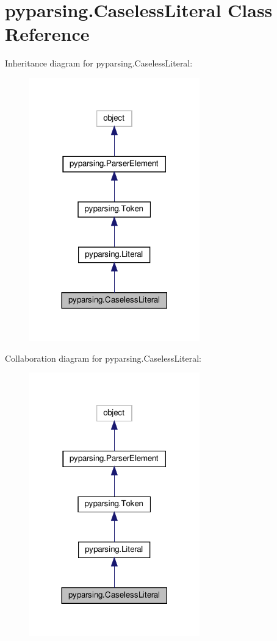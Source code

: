 \hypertarget{classpyparsing_1_1CaselessLiteral}{}\section{pyparsing.\+Caseless\+Literal Class Reference}
\label{classpyparsing_1_1CaselessLiteral}


Inheritance diagram for pyparsing.\+Caseless\+Literal\+:
\nopagebreak
\begin{figure}[H]
\begin{center}
\leavevmode
\includegraphics[width=209pt]{classpyparsing_1_1CaselessLiteral__inherit__graph}
\end{center}
\end{figure}


Collaboration diagram for pyparsing.\+Caseless\+Literal\+:
\nopagebreak
\begin{figure}[H]
\begin{center}
\leavevmode
\includegraphics[width=209pt]{classpyparsing_1_1CaselessLiteral__coll__graph}
\end{center}
\end{figure}
